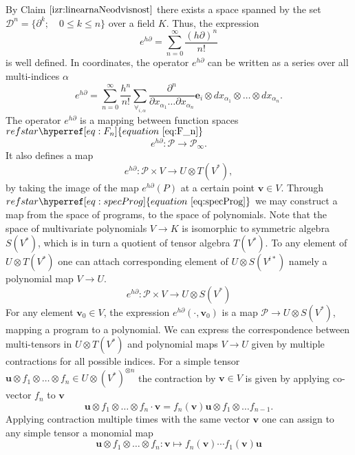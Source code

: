 \documentclass{article}
\makeatletter
\newcommand{\e}{\mathbf{e}}
\newcommand{\uu}{\mathbf{u}}
\newcommand{\vv}{\mathbf{v}}
\newcommand{\dP}{\mathcal{P}}
\newcommand{\D}{\partial}
\newcommand{\DD}{\mathcal{D}}
\let\originaleqref\eqref %
\renewcommand{\eqref}[1]{%
  \begingroup%
  \let\ref\@refstar%
  \hyperref[#1]{%
    equation%
    ~\originaleqref{#1}%
  }%
  \endgroup
}
\makeatother
\begin{document}
 By Claim $\ref{izr:linearnaNeodvisnost}$  there exists a space spanned by the set $\DD^n=\{\D^k;\quad 0\le k\le n\}$ over a field $K$. Thus, the expression
 \begin{equation}
 	e^{h\D}=\sum\limits_{n=0}^{\infty}\frac{(h\D)^n}{n!}
 \end{equation}
 is well defined. In coordinates, the operator $e^{h\D}$ can be written as a
 series over all multi-indices $\alpha$
 \begin{equation}\label{eq:e^d}
 	e^{h\D}=\sum\limits_{n=0}^{\infty}\frac{h^n}{n!}\sum_{\forall_{i,\alpha}}\frac{\partial^n}{\partial
 		    x_{\alpha_1}\ldots \partial x_{\alpha_n}}\e_i\otimes
 		  dx_{\alpha_1}\otimes\ldots \otimes dx_{\alpha_n}.
 \end{equation}
The operator $e^{h\D}$ is a mapping between function spaces $\eqref{eq:F_n}$
 \begin{equation}
 	e^{h\D}:\dP\to\dP_\infty.
 \end{equation}
 It also defines a map
  \begin{equation}\label{eq:specProg}
  	e^{h\D}:\dP\times V\to U\otimes T(V^*),
  \end{equation}
by taking the image of the map $e^{h\D}(P)$ at a certain point $\vv\in V$.  
Through $\eqref{eq:specProg}$ we may construct a map from the space of programs,
to the space of polynomials. Note that the space of multivariate polynomials
$V\to K$ is isomorphic to symmetric algebra $S(V^*)$, which is in turn a
quotient of tensor algebra $T(V^*)$. To any element of
 $U\otimes T(V^*)$ one can attach corresponding element of $U\otimes S(V^{i*})$
 namely a polynomial map  $V\to U$.
 \begin{equation}\label{eq:pToPol}
 	e^{h\D}: \dP\times V\to U\otimes S(V^*)
 \end{equation}
 For any element $\vv_0\in V$, the expression $e^{h\D}(\cdot,\vv_0)$ is a map $\dP\to
 U\otimes S(V^*)$, mapping a program to a polynomial. We can express the
 correspondence between multi-tensors in $U\otimes T(V^*)$ and polynomial maps
 $V\to U$ given by multiple contractions for all possible indices. For a simple tensor $\uu\otimes
 f_1\otimes\ldots\otimes f_n\in U\otimes(V^*)^{\otimes n}$ the contraction by
 $\vv\in V$ is given by applying co-vector $f_n$ to $\vv$ 
 \begin{equation}
   \label{eq:contraction}
 \uu\otimes f_1\otimes\ldots\otimes f_n\cdot \vv = f_n(\vv) \uu\otimes f_1\otimes\ldots f_{n-1}.
 \end{equation}
Applying contraction multiple times with the same vector $\vv$ one can assign to
any simple tensor a monomial map 
 \begin{equation}
   \label{eq:tensor->poly}
 \uu\otimes f_1\otimes\ldots\otimes f_n: \vv \mapsto f_n(\vv)\cdots f_1(\vv) \uu
 \end{equation}
\end{document}
